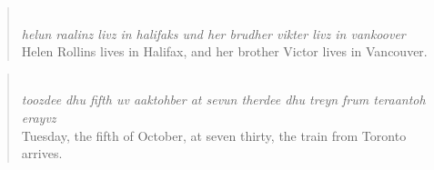 \begin{quote}\noindent {}\\[1pt]
\textit{helun raalinz livz in halifaks und her brudher vikter livz in vankoover}\\[1pt]
Helen Rollins lives in Halifax, and her brother Victor lives in Vancouver.
\end{quote}
\begin{quote}\noindent {}\\[1pt]
\textit{toozdee dhu fifth uv aaktohber at sevun therdee dhu treyn frum teraantoh erayvz}\\[1pt]
Tuesday, the fifth of October, at seven thirty, the train from Toronto arrives.
\end{quote}
